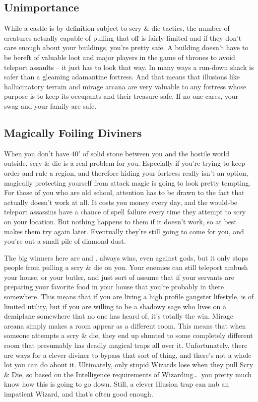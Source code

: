 \subsection{Unimportance}

While a castle is by definition subject to scry \& die tactics, the number of creatures actually capable of pulling that off is fairly limited and if they don't care enough about your buildings, you're pretty safe. A building doesn't have to be bereft of valuable loot and major players in the game of thrones to avoid teleport assaults -- it just has to look that way. In many ways a run-down shack is safer than a gleaming adamantine fortress. And that means that illusions like hallucinatory terrain and mirage arcana are very valuable to any fortress whose purpose is to keep its occupants and their treasure safe. If no one cares, your swag and your family are safe.

\subsection{Magically Foiling Diviners}

When you don't have 40' of solid stone between you and the hostile world outside, scry \& die is a real problem for you. Especially if you're trying to keep order and rule a region, and therefore hiding your fortress really isn't an option, magically protecting yourself from attack magic is going to look pretty tempting. For those of you who are old school, attention has to be drawn to the fact that  actually doesn't work at all. It costs you money every day, and the would-be teleport assassins have a chance of spell failure every time they attempt to scry on your location. But nothing happens to them if it doesn't work, so at best  makes them try again later. Eventually they're still going to come for you, and you're out a small pile of diamond dust.

The big winners here are  and .  always wins, even against gods, but it only stops people from pulling a scry \& die on you. Your enemies can still teleport ambush your house, or your butler, and just sort of assume that if your servants are preparing your favorite food in your house that you're probably in there somewhere. This means that if you are living a high profile gangster lifestyle,  is of limited utility, but if you are willing to be a shadowy sage who lives on a demiplane somewhere that no one has heard of, it's totally the win. Mirage arcana simply makes a room appear as a different room. This means that when someone attempts a scry \& die, they end up shunted to some completely different room that presumably has deadly magical traps all over it. Unfortunately, there are ways for a clever diviner to bypass that sort of thing, and there's not a whole lot you can do about it. Ultimately, only stupid Wizards lose when they pull Scry \& Die, so based on the Intelligence requirements of Wizarding\ldots\  you pretty much know how this is going to go down. Still, a clever Illusion trap can nab an impatient Wizard, and that's often good enough.

